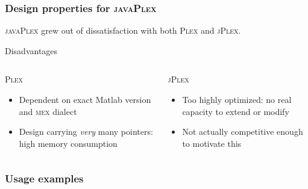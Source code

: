 \documentclass{beamer}
\newcommand\javaPlex{\textsc{javaPlex}\xspace}
\newcommand\jPlex{\textsc{jPlex}\xspace}
\newcommand\Plex{\textsc{Plex}\xspace}
\begin{document}
\begin{frame}
  \frametitle{Design properties for \javaPlex}
  
  \javaPlex grew out of dissatisfaction with both \Plex and \jPlex.

  \begin{block}{Disadvantages}
    \begin{columns}[t]
      \begin{column}{0.5\textwidth}
        \Plex
        \begin{itemize}
        \item Dependent on exact Matlab version and \textsc{mex} dialect
        \item Design carrying \emph{very} many pointers: high memory consumption
        \end{itemize}
      \end{column}
      \begin{column}{0.5\textwidth}
        \jPlex
        \begin{itemize}
        \item Too highly optimized: no real capacity to extend or modify
        \item Not actually competitive enough to motivate this
        \end{itemize}
      \end{column}
    \end{columns}
  \end{block}
\end{frame}

\begin{frame}
  \frametitle{Usage examples}
  
\end{frame}
\end{document}
